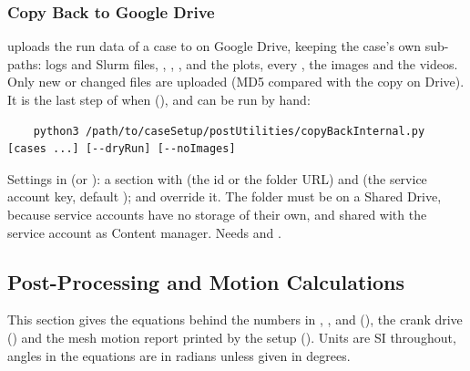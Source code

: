 \subsubsection{Copy Back to Google Drive}
 uploads the run data of a case to  on Google Drive, keeping the case's own sub-paths: logs and Slurm  files, , , ,  and the plots, every , the images and the videos. Only new or changed files are uploaded (MD5 compared with the copy on Drive). It is the last step of  when  (), and can be run by hand:
\begin{lstlisting}
    python3 /path/to/caseSetup/postUtilities/copyBackInternal.py [cases ...] [--dryRun] [--noImages]
\end{lstlisting}
Settings in  (or ): a \codeword{[drive]} section with  (the id or the folder URL) and  (the service account key, default );  and  override it. The folder must be on a Shared Drive, because service accounts have no storage of their own, and shared with the service account as Content manager. Needs  and .

\subsection{Post-Processing and Motion Calculations}\label{sec:postMath}
This section gives the equations behind the numbers in , ,  and  (), the crank drive () and the mesh motion report printed by the setup (). Units are SI throughout, angles in the equations are in radians unless given in degrees.

